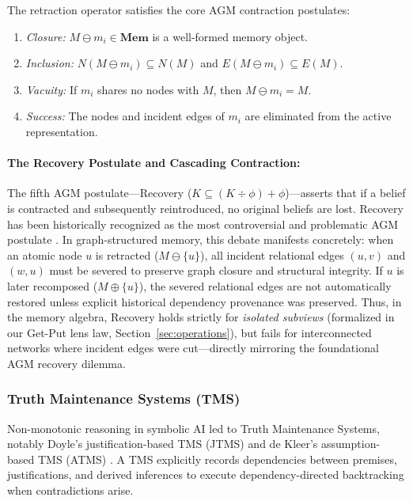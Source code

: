\documentclass[11pt,a4paper]{article}
\theoremstyle{definition}
\begin{document}
The retraction operator satisfies the core AGM contraction postulates:
\begin{enumerate}
    \item \emph{Closure:} $M \ominus m_i \in \mathbf{Mem}$ is a well-formed memory object.
    \item \emph{Inclusion:} $N(M \ominus m_i) \subseteq N(M)$ and $E(M \ominus m_i) \subseteq E(M)$.
    \item \emph{Vacuity:} If $m_i$ shares no nodes with $M$, then $M \ominus m_i = M$.
    \item \emph{Success:} The nodes and incident edges of $m_i$ are eliminated from the active representation.
\end{enumerate}

\paragraph{The Recovery Postulate and Cascading Contraction:}
The fifth AGM postulate---Recovery ($K \subseteq (K \div \phi) + \phi$)---asserts that if a belief is contracted and subsequently reintroduced, no original beliefs are lost. Recovery has been historically recognized as the most controversial and problematic AGM postulate \cite{makinson1987status,hansson1999textbook}. In graph-structured memory, this debate manifests concretely: when an atomic node $u$ is retracted ($M \ominus \{u\}$), all incident relational edges $(u, v)$ and $(w, u)$ must be severed to preserve graph closure and structural integrity. If $u$ is later recomposed ($M \oplus \{u\}$), the severed relational edges are not automatically restored unless explicit historical dependency provenance was preserved. Thus, in the memory algebra, Recovery holds strictly for \emph{isolated subviews} (formalized in our Get-Put lens law, Section~\ref{sec:operations}), but fails for interconnected networks where incident edges were cut---directly mirroring the foundational AGM recovery dilemma.

\subsubsection{Truth Maintenance Systems (TMS)}
Non-monotonic reasoning in symbolic AI led to Truth Maintenance Systems, notably Doyle's justification-based TMS (JTMS) \cite{doyle1979truth} and de Kleer's assumption-based TMS (ATMS) \cite{dekleer1986assumption}. A TMS explicitly records dependencies between premises, justifications, and derived inferences to execute dependency-directed backtracking when contradictions arise.
\end{document}
